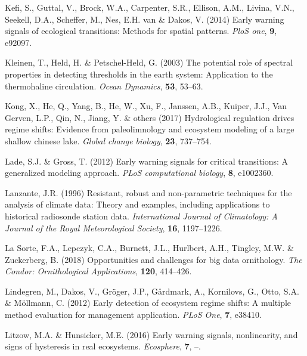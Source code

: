 \documentclass[print]{nuthesis}
\begin{document}
\leavevmode\hypertarget{ref-kefi2014early}{}%
Kefi, S., Guttal, V., Brock, W.A., Carpenter, S.R., Ellison, A.M., Livina, V.N., Seekell, D.A., Scheffer, M., Nes, E.H. van \& Dakos, V. (2014) Early warning signals of ecological transitions: Methods for spatial patterns. \emph{PloS one}, \textbf{9}, e92097.

\leavevmode\hypertarget{ref-kleinen2003potential}{}%
Kleinen, T., Held, H. \& Petschel-Held, G. (2003) The potential role of spectral properties in detecting thresholds in the earth system: Application to the thermohaline circulation. \emph{Ocean Dynamics}, \textbf{53}, 53--63.

\leavevmode\hypertarget{ref-kong2017hydrological}{}%
Kong, X., He, Q., Yang, B., He, W., Xu, F., Janssen, A.B., Kuiper, J.J., Van Gerven, L.P., Qin, N., Jiang, Y. \& others (2017) Hydrological regulation drives regime shifts: Evidence from paleolimnology and ecosystem modeling of a large shallow chinese lake. \emph{Global change biology}, \textbf{23}, 737--754.

\leavevmode\hypertarget{ref-lade2012early}{}%
Lade, S.J. \& Gross, T. (2012) Early warning signals for critical transitions: A generalized modeling approach. \emph{PLoS computational biology}, \textbf{8}, e1002360.

\leavevmode\hypertarget{ref-lanzante1996resistant}{}%
Lanzante, J.R. (1996) Resistant, robust and non-parametric techniques for the analysis of climate data: Theory and examples, including applications to historical radiosonde station data. \emph{International Journal of Climatology: A Journal of the Royal Meteorological Society}, \textbf{16}, 1197--1226.

\leavevmode\hypertarget{ref-lasorte2018opportunities}{}%
La Sorte, F.A., Lepczyk, C.A., Burnett, J.L., Hurlbert, A.H., Tingley, M.W. \& Zuckerberg, B. (2018) Opportunities and challenges for big data ornithology. \emph{The Condor: Ornithological Applications}, \textbf{120}, 414--426.

\leavevmode\hypertarget{ref-lindegren_early_2012}{}%
Lindegren, M., Dakos, V., Gröger, J.P., Gårdmark, A., Kornilovs, G., Otto, S.A. \& Möllmann, C. (2012) Early detection of ecosystem regime shifts: A multiple method evaluation for management application. \emph{PLoS One}, \textbf{7}, e38410.

\leavevmode\hypertarget{ref-litzow_early_2016}{}%
Litzow, M.A. \& Hunsicker, M.E. (2016) Early warning signals, nonlinearity, and signs of hysteresis in real ecosystems. \emph{Ecosphere}, \textbf{7}, --.
\end{document}
